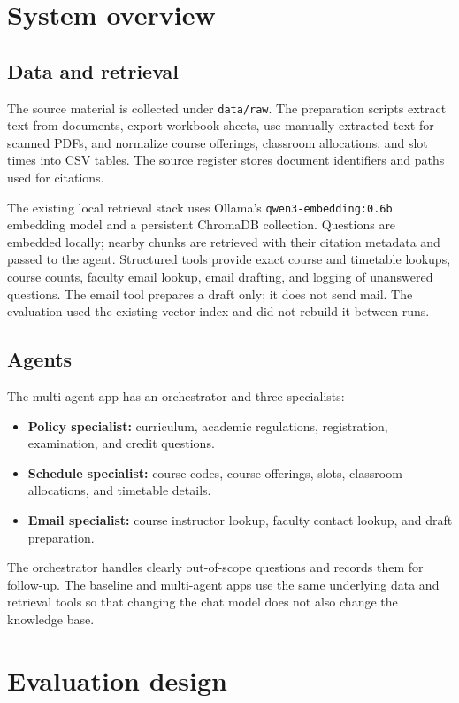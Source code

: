 \documentclass[11pt,a4paper]{article}
\begin{document}
\section{System overview}

\subsection{Data and retrieval}

The source material is collected under \texttt{data/raw}. The preparation scripts extract text from documents, export workbook sheets, use manually extracted text for scanned PDFs, and normalize course offerings, classroom allocations, and slot times into CSV tables. The source register stores document identifiers and paths used for citations.

The existing local retrieval stack uses Ollama's \texttt{qwen3-embedding:0.6b} embedding model and a persistent ChromaDB collection. Questions are embedded locally; nearby chunks are retrieved with their citation metadata and passed to the agent. Structured tools provide exact course and timetable lookups, course counts, faculty email lookup, email drafting, and logging of unanswered questions. The email tool prepares a draft only; it does not send mail. The evaluation used the existing vector index and did not rebuild it between runs.

\subsection{Agents}

The multi-agent app has an orchestrator and three specialists:
\begin{itemize}
  \item \textbf{Policy specialist:} curriculum, academic regulations, registration, examination, and credit questions.
  \item \textbf{Schedule specialist:} course codes, course offerings, slots, classroom allocations, and timetable details.
  \item \textbf{Email specialist:} course instructor lookup, faculty contact lookup, and draft preparation.
\end{itemize}
The orchestrator handles clearly out-of-scope questions and records them for follow-up. The baseline and multi-agent apps use the same underlying data and retrieval tools so that changing the chat model does not also change the knowledge base.

\section{Evaluation design}
\end{document}
